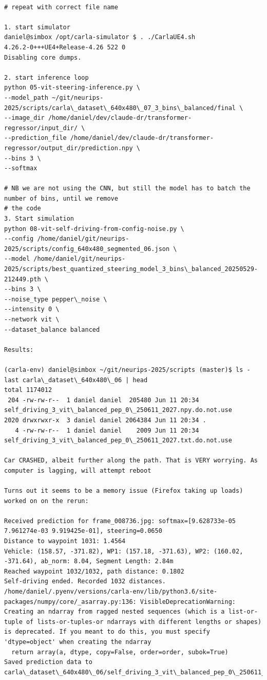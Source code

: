 \begin{verbatim}

# repeat with correct file name

1. start simulator
daniel@simbox /opt/carla-simulator $ . ./CarlaUE4.sh 
4.26.2-0+++UE4+Release-4.26 522 0
Disabling core dumps.

2. start inference loop
python 05-vit-steering-inference.py \
--model_path ~/git/neurips-2025/scripts/carla\_dataset\_640x480\_07_3_bins\_balanced/final \
--image_dir /home/daniel/dev/claude-dr/transformer-regressor/input_dir/ \
--prediction_file /home/daniel/dev/claude-dr/transformer-regressor/output_dir/prediction.npy \
--bins 3 \
--softmax

# NB we are not using the CNN, but still the model has to batch the number of bins, until we remove
# the code
3. Start simulation
python 08-vit-self-driving-from-config-noise.py \
--config /home/daniel/git/neurips-2025/scripts/config_640x480_segmented_06.json \
--model /home/daniel/git/neurips-2025/scripts/best_quantized_steering_model_3_bins\_balanced_20250529-212449.pth \
--bins 3 \
--noise_type pepper\_noise \
--intensity 0 \
--network vit \
--dataset_balance balanced

Results:

(carla-env) daniel@simbox ~/git/neurips-2025/scripts (master)$ ls -last carla\_dataset\_640x480\_06 | head
total 1174012
 204 -rw-rw-r--  1 daniel daniel  205480 Jun 11 20:34 self_driving_3_vit\_balanced_pep_0\_250611_2027.npy.do.not.use
2020 drwxrwxr-x  3 daniel daniel 2064384 Jun 11 20:34 .
   4 -rw-rw-r--  1 daniel daniel    2009 Jun 11 20:34 self_driving_3_vit\_balanced_pep_0\_250611_2027.txt.do.not.use

Car CRASHED, albeit further along the path. That is VERY worrying. As computer is lagging, will attempt reboot

Turns out it seems to be a memory issue (Firefox taking up loads) worked on on the rerun:

Received prediction for frame_008736.jpg: softmax=[9.628733e-05 7.961274e-03 9.919425e-01], steering=0.0650
Distance to waypoint 1031: 1.4564
Vehicle: (158.57, -371.82), WP1: (157.18, -371.63), WP2: (160.02, -371.64), ab_norm: 8.04, Segment Length: 2.84m
Reached waypoint 1032/1032, path distance: 0.1802
Self-driving ended. Recorded 1032 distances.
/home/daniel/.pyenv/versions/carla-env/lib/python3.6/site-packages/numpy/core/_asarray.py:136: VisibleDeprecationWarning: Creating an ndarray from ragged nested sequences (which is a list-or-tuple of lists-or-tuples-or ndarrays with different lengths or shapes) is deprecated. If you meant to do this, you must specify 'dtype=object' when creating the ndarray
  return array(a, dtype, copy=False, order=order, subok=True)
Saved prediction data to carla\_dataset\_640x480\_06/self_driving_3_vit\_balanced_pep_0\_250611_2039.npy


\end{verbatim}
